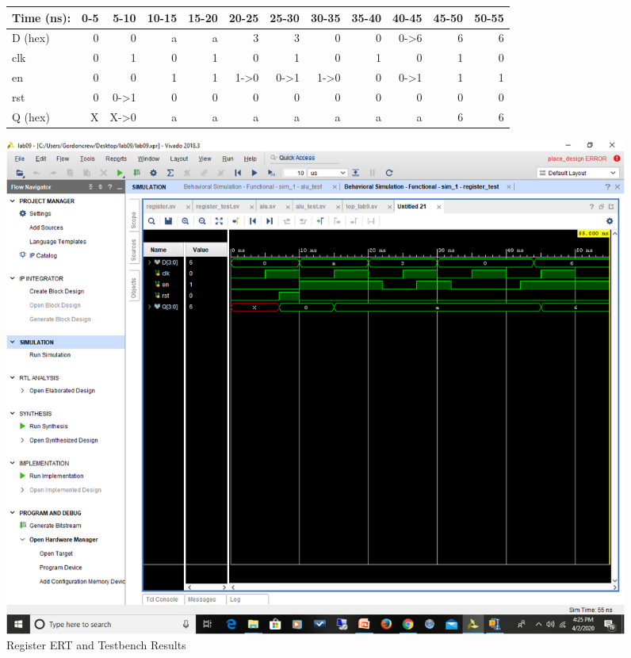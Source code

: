 \documentclass[11pt]{article}
\begin{document}
\begin{figure}[ht]\centering
	\begin{tabular}{l|rrrrrrrrrrr}
		Time (ns): & 0-5 & 5-10 & 10-15 & 15-20 & 20-25 & 25-30 & 30-35 & 35-40 & 40-45 & 45-50 & 50-55 \\
		\midrule 
		D (hex) & 0 & 0 & a & a & 3 & 3 & 0 & 0 & 0->6 & 6 & 6  \\
		clk & 0 & 1 & 0 & 1 & 0 & 1 & 0 & 1 & 0 & 1 & 0 \\
		en & 0 & 0 & 1 & 1 & 1->0 & 0->1 & 1->0 & 0 & 0->1 & 1 & 1 \\
		rst & 0 & 0->1 & 0 & 0 & 0 & 0 & 0 & 0 & 0 & 0 & 0 \\
		\midrule
		Q (hex) & X & X->0 & a & a & a & a & a & a & a & 6 & 6  \\
		\bottomrule
	\end{tabular}\medskip

	\includegraphics[width=1.1\textwidth]{register.png}
	\caption{Register ERT and Testbench Results}
	\label{fig:sim_with_table}
\end{figure}
\end{document}
